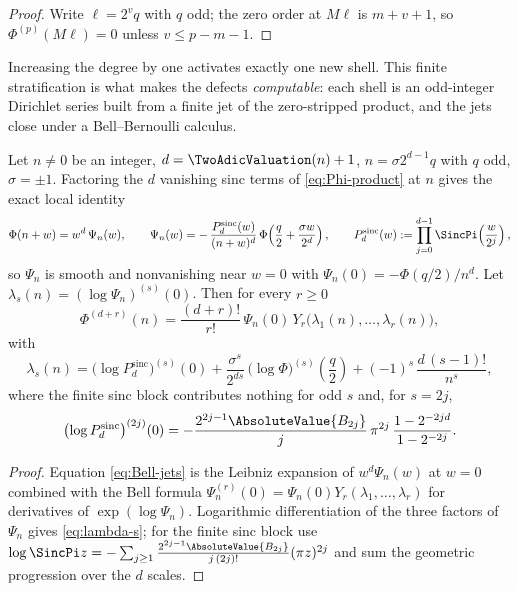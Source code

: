 \documentclass[11pt,oneside]{article}
\numberwithin{equation}{section}
\theoremstyle{definition}
\theoremstyle{remark}
\newcommand{\Bell}{Y}
\begin{document}
\begin{proof}
Write $\ell=2^{v}q$ with $q$ odd; the zero order at $M\ell$ is
$m+v+1$, so $\Phi^{(p)}(M\ell)=0$ unless $v\le p-m-1$.
\end{proof}

Increasing the degree by one activates exactly one new shell.  This
finite stratification is what makes the defects \emph{computable}: each
shell is an odd-integer Dirichlet series built from a finite jet of
the zero-stripped product, and the jets close under a Bell--Bernoulli
calculus.

\begin{proposition}
\label{prop:Bell-jets}
Let $n\ne0$ be an integer, $d=\TwoAdicValuation(n)+1$, $n=\sigma2^{d-1}q$ with $q$
odd, $\sigma=\pm1$.  Factoring the $d$ vanishing sinc terms of
\eqref{eq:Phi-product} at $n$ gives the exact local identity
\begin{equation}
 \Phi(n+w)=w^{d}\,\Psi_n(w),
 \qquad
 \Psi_n(w)
 =-\,\frac{P^{\mathrm{sinc}}_d(w)}{(n+w)^{d}}\,
 \Phi\!\left(\frac q2+\frac{\sigma w}{2^{d}}\right),
 \qquad
 P^{\mathrm{sinc}}_d(w):=\prod_{j=0}^{d-1}\SincPi\!\left(\frac{w}{2^{j}}\right),
 \label{eq:local-factorization}
\end{equation}
so $\Psi_n$ is smooth and nonvanishing near $w=0$ with
$\Psi_n(0)=-\Phi(q/2)/n^{d}$.  Let
$\lambda_s(n)=(\log\Psi_n)^{(s)}(0)$.  Then for every $r\ge0$
\begin{equation}
 \Phi^{(d+r)}(n)
 =\frac{(d+r)!}{r!}\,\Psi_n(0)\,
 \Bell_r\bigl(\lambda_1(n),\dots,\lambda_r(n)\bigr),
 \label{eq:Bell-jets}
\end{equation}
with
\begin{equation}
 \lambda_s(n)
 =\bigl(\log P^{\mathrm{sinc}}_d\bigr)^{(s)}(0)
 +\frac{\sigma^{s}}{2^{ds}}\,
 \bigl(\log\Phi\bigr)^{(s)}\!\left(\frac q2\right)
 +(-1)^{s}\,\frac{d\,(s-1)!}{n^{s}},
 \label{eq:lambda-s}
\end{equation}
where the finite sinc block contributes nothing for odd $s$ and, for
$s=2j$,
\begin{equation}
 \bigl(\log P^{\mathrm{sinc}}_d\bigr)^{(2j)}(0)
 =-\frac{2^{2j-1}\AbsoluteValue{B_{2j}}}{j}\,\pi^{2j}\,
 \frac{1-2^{-2jd}}{1-2^{-2j}}.
 \label{eq:Bernoulli-log-jet}
\end{equation}
\end{proposition}

\begin{proof}
Equation \eqref{eq:Bell-jets} is the Leibniz expansion of
$w^{d}\Psi_n(w)$ at $w=0$ combined with the Bell formula
$\Psi_n^{(r)}(0)=\Psi_n(0)\Bell_r(\lambda_1,\dots,\lambda_r)$ for
derivatives of $\exp(\log\Psi_n)$.  Logarithmic differentiation of the
three factors of $\Psi_n$ gives \eqref{eq:lambda-s}; for the finite
sinc block use
$\log\SincPi z=-\sum_{j\ge1}
\frac{2^{2j-1}\AbsoluteValue{B_{2j}}}{j\,(2j)!}(\pi z)^{2j}$
and sum the geometric progression over the $d$ scales.
\end{proof}
\end{document}
